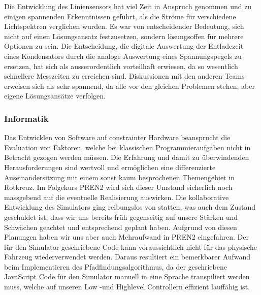 \documentclass[main.tex]{subfiles} %
\begin{document}
Die Entwicklung des Liniensensors hat viel Zeit in Anspruch genommen und zu
einigen spannenden Erkenntnissen geführt, als die Ströme für verschiedene
Lichtspektren verglichen wurden. Es war von entscheidender Bedeutung, sich
nicht auf einen Lösungsansatz festzusetzen, sondern lösungsoffen für mehrere
Optionen zu sein. Die Entscheidung, die digitale Auswertung der Entladezeit
eines Kondensators durch die analoge Auswertung eines Spannungspegels zu
ersetzen, hat sich als ausserordentlich vorteilhaft erwiesen, da so wesentlich
schnellere Messzeiten zu erreichen sind. Diskussionen mit den anderen Teams
erweisen sich als sehr spannend, da alle vor den gleichen Problemen stehen,
aber eigene Lösungsansätze verfolgen.

\subsubsection{Informatik}
Das Entwicklen von Software auf constrainter Hardware beansprucht die
Evaluation von Faktoren, welche bei klassischen Programmieraufgaben nicht in
Betracht gezogen werden müssen. Die Erfahrung und damit zu überwindenden
Herausforderungen sind wertvoll und ermöglichen eine differenzierte
Auseinandersitzung mit einem sonst kaum besprochenen Themengebiet in Rotkreuz.
Im Folgekurs PREN2 wird sich dieser Umstand sicherlich noch massgebend auf die
eventuelle Realisierung auswirken. Die kollaborative Entwicklung des Simulators
ging reibungslos von statten, was auch dem Zustand geschuldet ist, dass wir uns
bereits früh gegenseitig auf unsere Stärken und Schwächen geachtet und
entsprechend geplant haben. Aufgrund von diesen Planungen haben wir uns aber
auch Mehraufwand in PREN2 eingefahren. Der für den Simulator geschriebene Code
kann voraussichtlich nicht für das physische Fahrzeug wiederverwendet werden.
Daraus resultiert ein bemerkbarer Aufwand beim Implementieren des
Pfadfindungsalgorithmus, da der geschriebene JavaScript Code für den Simulator
manuell in eine Sprache transpiliert werden muss, welche auf unseren Low -und
Highlevel Controllern effizient lauffähig ist.
\end{document}
